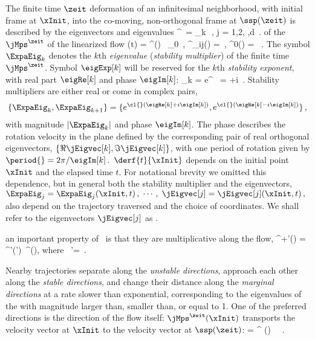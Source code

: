 The finite time $\zeit$
deformation of an infinitesimal neighborhood, with initial frame at $\xInit$,
into the co-moving, non-orthogonal frame at $\ssp(\zeit)$
is described by the eigen\-vectors and eigen\-values
\beq
\jMps^\zeit\, \jEigvec[k] = \ExpaEig_{k} \,\jEigvec[k]
\,,\qquad
j = 1,2, \cdots,d
\,.
of the {\jacobianM} $\jMps^\zeit$
of the linearized flow
\beq
    \deltaX(t) = \jMps^\zeit(\xInit) \, \deltaX_0
    \,, \qquad
\jMps^\zeit_{ij}(\xInit)
  =  
    \,, \quad
\jMps^0(\xInit) = \matId
\, .
\label{hOdes}
\eeq
%
The symbol $\ExpaEig_k$ denotes the $k$th {\em eigen\-value}
({\em stability multiplier}) of the finite time {\jacobianM} $\jMps^\zeit$.
Symbol $\eigExp[k]$ will be reserved for the $k$th \emph{stability exponent},
with real part $\eigRe[k]$ and phase $\eigIm[k]$:
\beq
\ExpaEig_k = e^{\zeit \eigExp[k]}
    \,\qquad
\eigExp[k] = \eigRe[k] +i \eigIm[k]
\,.
Stability multipliers are either real or
come in complex pairs,
\[
\{\ExpaEig_{k},\ExpaEig_{k+1}\}
= \{e^{\cl{}(\eigRe[k] + i\eigIm[k])}, e^{\cl{}(\eigRe[k] - i\eigIm[k])}\}
\,,
\]
with magnitude $|\ExpaEig_k|$ and phase $\eigIm[k]$.
The phase describes the
rotation velocity in the plane defined by the corresponding pair of
real orthogonal eigen\-vectors, $\{\Re\jEigvec[k],\Im\jEigvec[k]\}$,
with one period of rotation given by
\( %
    \period{} = 2\pi/\eigIm[k]
\,.
\) %
$\derf{t}{\xInit}$ depends on the initial point $\xInit$ and the
elapsed time $t$. For notational brevity we omitted this dependence,
but in general both the stability
multiplier and the eigenvectors,
\(
\ExpaEig_j = \ExpaEig_j(\xInit,t)
    \,,\; \cdots \,,\;
\jEigvec[j] = \jEigvec[j](\xInit,t)
\,,
\)
also depend on the trajectory traversed and the choice of
coordinates. We shall refer to the eigenvectors $\jEigvec[j]$ as
\emph{{\cLvs}}.

an important property of \jacobianMs\ is that they
are multiplicative along the flow,
\beq
\jMps^{\zeit+\zeit'}\!(\ssp)
    = \jMps^{\zeit'}\!(\ssp')\, \jMps^\zeit(\ssp), \qquad \mbox{where} \,\;
\ssp'=\flow{\zeit}{\xInit}
\,.


Nearby trajectories separate along the {\em unstable directions},
approach each other along the {\em stable directions}, and change
their distance along the {\em marginal directions} at a rate slower
than exponential, corresponding to the eigen\-values of  the
{\jacobianM} with magnitude larger than, smaller than, or equal to 1.
One of the preferred directions is the
direction of the flow itself: $\jMps^{\zeit} (\xInit)$ transports
the velocity vector at $\xInit$ to the velocity vector at
$\ssp(\zeit)$:
\beq
\velField{\ssp(\zeit)} = \jMps^{\zeit} (\xInit) \,\velField{\xInit} \, .

